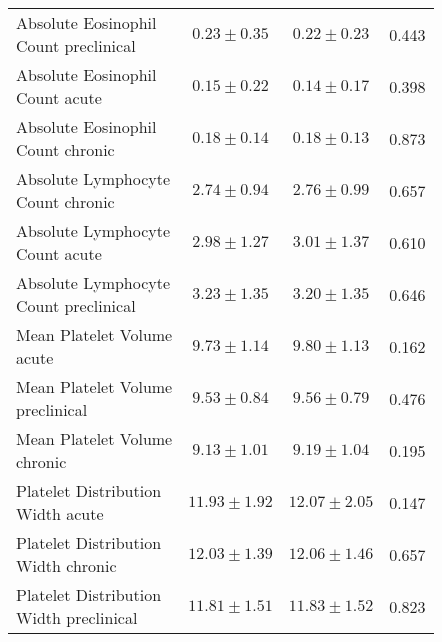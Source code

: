 \begin{table}[htbp]
\begin{tabular}{lccc}
\makecell[l]{Absolute Eosinophil \\ Count preclinical} & $0.23 \pm 0.35$ & $0.22 \pm 0.23$ & 0.443  \\

\makecell[l]{Absolute Eosinophil \\ Count acute} & $0.15 \pm 0.22$ & $0.14 \pm 0.17$ & 0.398  \\

\makecell[l]{Absolute Eosinophil \\ Count chronic} & $0.18 \pm 0.14$ & $0.18 \pm 0.13$ & 0.873  \\

\makecell[l]{Absolute Lymphocyte \\ Count chronic} & $2.74 \pm 0.94$ & $2.76 \pm 0.99$ & 0.657  \\

\makecell[l]{Absolute Lymphocyte \\ Count acute} & $2.98 \pm 1.27$ & $3.01 \pm 1.37$ & 0.610  \\

\makecell[l]{Absolute Lymphocyte \\ Count preclinical} & $3.23 \pm 1.35$ & $3.20 \pm 1.35$ & 0.646  \\

\makecell[l]{Mean Platelet Volume \\ acute} & $9.73 \pm 1.14$ & $9.80 \pm 1.13$ & 0.162  \\

\makecell[l]{Mean Platelet Volume \\ preclinical} & $9.53 \pm 0.84$ & $9.56 \pm 0.79$ & 0.476  \\

\makecell[l]{Mean Platelet Volume \\ chronic} & $9.13 \pm 1.01$ & $9.19 \pm 1.04$ & 0.195  \\

\makecell[l]{Platelet Distribution \\ Width acute} & $11.93 \pm 1.92$ & $12.07 \pm 2.05$ & 0.147  \\

\makecell[l]{Platelet Distribution \\ Width chronic} & $12.03 \pm 1.39$ & $12.06 \pm 1.46$ & 0.657  \\

\makecell[l]{Platelet Distribution \\ Width preclinical} & $11.81 \pm 1.51$ & $11.83 \pm 1.52$ & 0.823  \\


\end{tabular}
\end{table}
